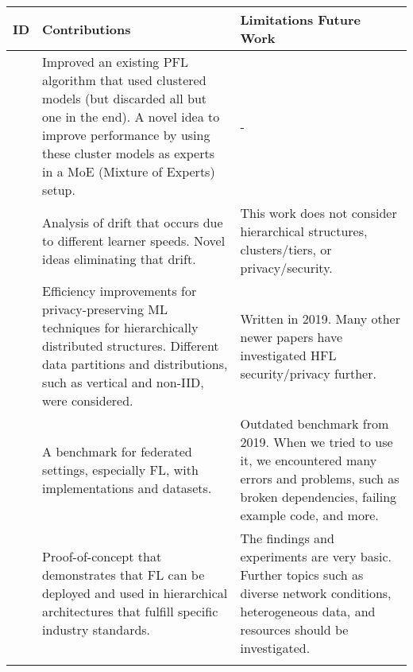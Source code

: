 \begin{changemargin}{-2cm}{0cm} 
    \begin{tabular}{|c||m{0.4\paperwidth}|m{0.4\paperwidth}|}
        \hline
            ID & Contributions & Limitations Future Work \\
        \hline
            \cite{paper:adaptive_exper_models_for_pfl}
            &
            Improved an existing PFL algorithm that used clustered models (but discarded all but one in the end).
            A novel idea to improve performance by using these cluster models as experts in a MoE (Mixture of Experts) setup.
            &
            -
        \\
        \hline
            \cite{paper:tackling_objective_inconsistency_problem_in_heterogeneous_fl}
            &
            Analysis of drift that occurs due to different learner speeds.
            Novel ideas eliminating that drift.
            &
            This work does not consider hierarchical structures, clusters/tiers, or privacy/security.
        \\
        \hline
            \cite{paper:efficient_privacy_preserving_ml_in_hierarchical_distributed_systems}
            &
            Efficiency improvements for privacy-preserving ML techniques for hierarchically distributed structures.
            Different data partitions and distributions, such as vertical and non-IID, were considered.
            &
            Written in 2019.
            Many other newer papers have investigated HFL security/privacy further.
        \\
        \hline
            \cite{paper:leaf_fl_benchmark}
            &
            A benchmark for federated settings, especially FL, with implementations and datasets.
            &
            Outdated benchmark from 2019.
            When we tried to use it, we encountered many errors and problems, such as broken dependencies, failing example code, and more.
        \\
        \hline
            \cite{paper:deploying_fl_in_hierarchical_edge_architecture}
            &
            Proof-of-concept that demonstrates that FL can be deployed and used in hierarchical architectures that fulfill specific industry standards.
            &
            The findings and experiments are very basic.
            Further topics such as diverse network conditions, heterogeneous data, and resources should be investigated.
        \\
        \hline
            \cite{paper:hfl_with_momentum_acceleration_in_multi_tier_networks}

\end{tabular}
\end{changemargin}

